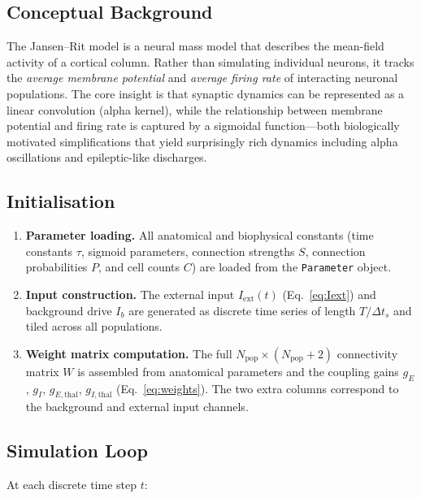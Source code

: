 \documentclass[12pt, a4paper]{article}
\begin{document}
\subsection{Conceptual Background}

The Jansen--Rit model \cite{JansenRit1995} is a neural mass model that describes the
mean-field activity of a cortical column.  Rather than simulating individual neurons,
it tracks the \emph{average membrane potential} and \emph{average firing rate} of
interacting neuronal populations.  The core insight is that synaptic dynamics can be
represented as a linear convolution (alpha kernel), while the relationship between
membrane potential and firing rate is captured by a sigmoidal function---both biologically
motivated simplifications that yield surprisingly rich dynamics including alpha oscillations
and epileptic-like discharges.

\subsection{Initialisation}

\begin{enumerate}
    \item \textbf{Parameter loading.}  All anatomical and biophysical constants
    (time constants $\tau$, sigmoid parameters, connection strengths $S$,
    connection probabilities $P$, and cell counts $C$) are loaded from the
    \texttt{Parameter} object.

    \item \textbf{Input construction.}  The external input $I_\text{ext}(t)$
    (Eq.~\ref{eq:Iext}) and background drive $I_b$ are generated as discrete
    time series of length $T/\Delta t_s$ and tiled across all populations.

    \item \textbf{Weight matrix computation.}  The full $N_\text{pop} \times
    (N_\text{pop}+2)$ connectivity matrix $W$ is assembled from anatomical
    parameters and the coupling gains $g_E$, $g_I$, $g_{E,\text{thal}}$,
    $g_{I,\text{thal}}$ (Eq.~\ref{eq:weights}).  The two extra columns correspond
    to the background and external input channels.
\end{enumerate}

\subsection{Simulation Loop}

At each discrete time step $t$:
\end{document}
